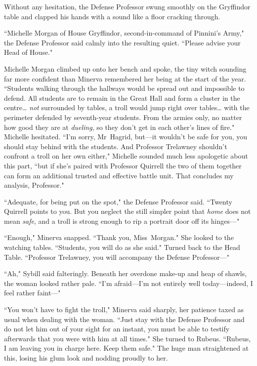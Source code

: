 Without any hesitation, the Defense Professor swung smoothly on the Gryffindor table and clapped his hands with a sound like a floor cracking through.

``Michelle Morgan of House Gryffindor, second-in-command of Pinnini's Army," the Defense Professor said calmly into the resulting quiet. ``Please advise your Head of House."

Michelle Morgan climbed up onto her bench and spoke, the tiny witch sounding far more confident than Minerva remembered her being at the start of the year. ``Students walking through the hallways would be spread out and impossible to defend. All students are to remain in the Great Hall and form a cluster in the centre{\ldots} \emph{not} surrounded by tables, a troll would jump right over tables{\ldots} with the perimeter defended by seventh-year students. From the armies only, no matter how good they are at \emph{dueling}, so they don't get in each other's lines of fire." Michelle hesitated. ``I'm sorry, Mr~Hagrid, but—it wouldn't be safe for you, you should stay behind with the students. And Professor Trelawney shouldn't confront a troll on her own either," Michelle sounded much less apologetic about this part, ``but if she's paired with Professor Quirrell the two of them together can form an additional trusted and effective battle unit. That concludes my analysis, Professor."

``Adequate, for being put on the spot," the Defense Professor said. ``Twenty Quirrell points to you. But you neglect the still simpler point that \emph{home} does not mean \emph{safe}, and a troll is strong enough to rip a portrait door off its hinges—"

``Enough," Minerva snapped. ``Thank you, Miss~Morgan." She looked to the watching tables. ``Students, you will do as she said." Turned back to the Head Table. ``Professor Trelawney, you will accompany the Defense Professor—"

``Ah," Sybill said falteringly. Beneath her overdone make-up and heap of shawls, the woman looked rather pale. ``I'm afraid—I'm not entirely well today—indeed, I feel rather faint—"

``You won't have to fight the troll," Minerva said sharply, her patience taxed as usual when dealing with the woman. ``Just stay with the Defense Professor and do not let him out of your sight for an instant, you must be able to testify afterwards that you were with him at all times." She turned to Rubeus. ``Rubeus, I am leaving you in charge here. Keep them safe." The huge man straightened at this, losing his glum look and nodding proudly to her.

